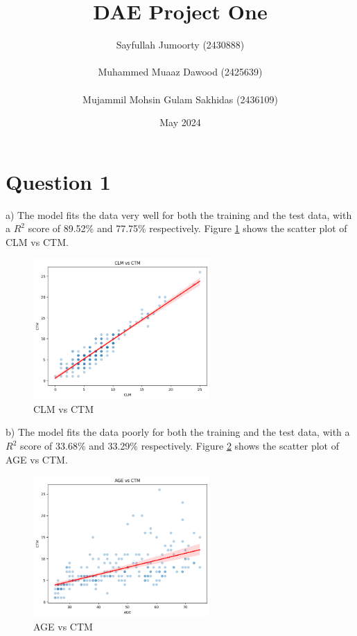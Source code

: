 \documentclass{article}
\title{DAE Project One}
\author{
Sayfullah Jumoorty (2430888)
\\ \\
Muhammed Muaaz Dawood (2425639)
\\ \\
Mujammil Mohsin Gulam Sakhidas (2436109)
}
\date{May 2024}
\begin{document}
\maketitle

\section*{Question 1}

a)  The model fits the data very well for both the training and the test data, with a $R^2$ score of 89.52\%  and 77.75\%  respectively. Figure \ref{CLMCTM} shows the scatter plot of CLM vs CTM.

\begin{figure}[H]
\centering
\includegraphics[width=0.6\textwidth]{CLM.png}
\caption{CLM vs CTM}
\label{CLMCTM}
\end{figure}
\noindent b)  The model fits the data poorly for both the training and the test data, with a $R^2$ score of 33.68\%  and 33.29\% respectively. Figure \ref{AGECTM} shows the scatter plot of AGE vs CTM.

\begin{figure}[H]
\centering
\includegraphics[width=0.6\textwidth]{AGE.png}
\caption{AGE vs CTM}
\label{AGECTM}
\end{figure}
\end{document}
